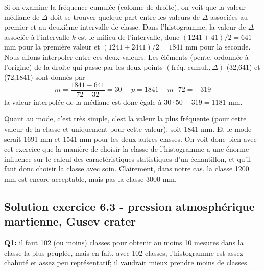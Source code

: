 \begin{enumerate}
Si on examine la fréquence cumulée (colonne de droite), on voit que la valeur médiane de $\Delta$ doit se trouver quelque part entre les valeurs de $\Delta$ associées au premier et au deuxième intervalle de classe. Dans l'histogramme, la valeur de $\Delta$ associée à l'intervalle $k$ est le milieu de l'intervalle, donc $(1241+41)/2=641$ mm pour la première valeur et $(1241+2441)/2=1841$ mm pour la seconde. Nous allons interpoler entre ces deux valeurs. Les éléments (pente, ordonnée à l'origine) de la droite qui passe par les deux points $(\text{fréq. cumul.},\Delta)$ (32,641) et (72,1841) sont donnés par
$$
m=\frac{1841-641}{72-32}=30\ \ \ \ \ \ p=1841-m\cdot72=-319
$$
la valeur interpolée de la médiane est donc égale à $30\cdot50-319=1181$ mm.

Quant au mode, c'est très simple, c'est la valeur la plus fréquente (pour cette valeur de la classe et uniquement pour cette valeur), soit 1841 mm. Et le mode serait 1691 mm et 1541 mm pour les deux autres classes. On voit donc bien avec cet exercice que la manière de choisir la classe de l'histogramme a une énorme influence sur le calcul des caractéristiques statistiques d'un échantillon, et qu'il faut donc choisir la classe avec soin. Clairement, dans notre cas, la classe 1200 mm est encore acceptable, mais pas la classe 3000 mm.
\end{enumerate}

\subsection*{Solution exercice 6.3 - pression atmosphérique martienne, Gusev crater}

\textbf{Q1:} il faut 102 (ou moins) classes pour obtenir au moins 10 mesures dans la classe la plus peuplée, mais en fait, avec 102 classes, l'histogramme est assez chahuté et assez peu représentatif; il vaudrait mieux prendre moins de classes.


